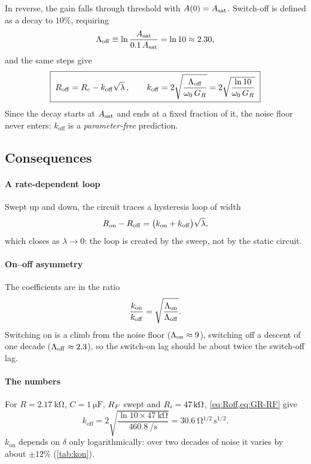 In reverse, the gain falls through threshold with $A(0)=A_{\mathrm{sat}}$. Switch-off is defined as a decay to
$10\%$, requiring
\begin{equation}
  \Lambda_{\mathrm{off}} \equiv \ln\frac{A_{\mathrm{sat}}}{0.1\,A_{\mathrm{sat}}} = \ln 10 \approx 2.30 ,
  \label{eq:Loff}
\end{equation}
and the same steps give
\begin{equation}
  \boxed{\;R_{\mathrm{off}} = R_{c} - k_{\mathrm{off}}\sqrt{\lambda}\,, \qquad
  k_{\mathrm{off}} = 2\sqrt{\frac{\Lambda_{\mathrm{off}}}{\omega_{0}\,G_{R}}} = 2\sqrt{\frac{\ln 10}{\omega_{0}\,G_{R}}}\;}
  \label{eq:Roff}
\end{equation}
Since the decay starts at $A_{\mathrm{sat}}$ and ends at a fixed fraction of it, the noise floor never enters:
$k_{\mathrm{off}}$ is a \emph{parameter-free} prediction.

\subsection{Consequences}

\paragraph{A rate-dependent loop} Swept up and down, the circuit traces a hysteresis loop of width
\begin{equation}
  R_{\mathrm{on}} - R_{\mathrm{off}} = \bigl(k_{\mathrm{on}} + k_{\mathrm{off}}\bigr)\sqrt{\lambda} ,
  \label{eq:loop-width}
\end{equation}
which closes as $\lambda\to 0$: the loop is created by the sweep, not by the static circuit.

\paragraph{On--off asymmetry} The coefficients are in the ratio
\begin{equation}
  \frac{k_{\mathrm{on}}}{k_{\mathrm{off}}} = \sqrt{\frac{\Lambda_{\mathrm{on}}}{\Lambda_{\mathrm{off}}}} .
  \label{eq:k-ratio}
\end{equation}
Switching on is a climb from the noise floor ($\Lambda_{\mathrm{on}}\approx 9$), switching off a descent of one decade
($\Lambda_{\mathrm{off}}\approx 2.3$), so the switch-on lag should be about twice the switch-off lag.

\paragraph{The numbers} For $R=\SI{2.17}{\kilo\ohm}$, $C=\SI{1}{\micro\farad}$, $R_{F}$ swept and
$R_{i}=\SI{47}{\kilo\ohm}$, \cref{eq:Roff,eq:GR-RF} give
\begin{equation}
  k_{\mathrm{off}} = 2\sqrt{\frac{\ln 10\times\SI{47}{\kilo\ohm}}{\SI{460.8}{\per\second}}}
  = \SI{30.6}{\ohm^{1/2}\,\second^{1/2}} .
  \label{eq:koff-value}
\end{equation}
$k_{\mathrm{on}}$ depends on $\delta$ only logarithmically: over two decades of noise it varies by about
$\pm12\%$ (\cref{tab:kon}).

